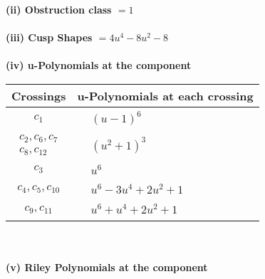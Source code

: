 \documentclass[1p]{elsarticle_modified}
\theoremstyle{definition}
\begin{document}
\flushleft \textbf{(ii) Obstruction class $= 1$}\\~\\
\flushleft \textbf{(iii) Cusp Shapes $= 4 u^4-8 u^2-8$}\\~\\
\newpage\renewcommand{\arraystretch}{1}
\flushleft \textbf{(iv) u-Polynomials at the component}\newline \\
\begin{tabular}{m{50pt}|m{274pt}}
Crossings & \hspace{64pt}u-Polynomials at each crossing \\
\hline $$\begin{aligned}c_{1}\end{aligned}$$&$\begin{aligned}
&(u-1)^6
\end{aligned}$\\
\hline $$\begin{aligned}c_{2},c_{6},c_{7}\\c_{8},c_{12}\end{aligned}$$&$\begin{aligned}
&(u^2+1)^3
\end{aligned}$\\
\hline $$\begin{aligned}c_{3}\end{aligned}$$&$\begin{aligned}
&u^6
\end{aligned}$\\
\hline $$\begin{aligned}c_{4},c_{5},c_{10}\end{aligned}$$&$\begin{aligned}
&u^6-3 u^4+2 u^2+1
\end{aligned}$\\
\hline $$\begin{aligned}c_{9},c_{11}\end{aligned}$$&$\begin{aligned}
&u^6+u^4+2 u^2+1
\end{aligned}$\\
\hline
\end{tabular}\\~\\
\newpage\renewcommand{\arraystretch}{1}
\flushleft \textbf{(v) Riley Polynomials at the component}\newline \\
\end{document}
